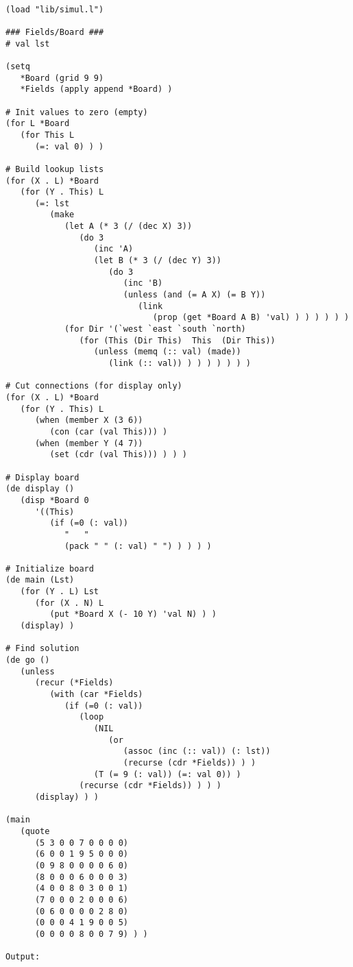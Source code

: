\begin{verbatim}

(load "lib/simul.l")

### Fields/Board ###
# val lst

(setq
   *Board (grid 9 9)
   *Fields (apply append *Board) )

# Init values to zero (empty)
(for L *Board
   (for This L
      (=: val 0) ) )

# Build lookup lists
(for (X . L) *Board
   (for (Y . This) L
      (=: lst
         (make
            (let A (* 3 (/ (dec X) 3))
               (do 3
                  (inc 'A)
                  (let B (* 3 (/ (dec Y) 3))
                     (do 3
                        (inc 'B)
                        (unless (and (= A X) (= B Y))
                           (link
                              (prop (get *Board A B) 'val) ) ) ) ) ) )
            (for Dir '(`west `east `south `north)
               (for (This (Dir This)  This  (Dir This))
                  (unless (memq (:: val) (made))
                     (link (:: val)) ) ) ) ) ) ) )

# Cut connections (for display only)
(for (X . L) *Board
   (for (Y . This) L
      (when (member X (3 6))
         (con (car (val This))) )
      (when (member Y (4 7))
         (set (cdr (val This))) ) ) )

# Display board
(de display ()
   (disp *Board 0
      '((This)
         (if (=0 (: val))
            "   "
            (pack " " (: val) " ") ) ) ) )

# Initialize board
(de main (Lst)
   (for (Y . L) Lst
      (for (X . N) L
         (put *Board X (- 10 Y) 'val N) ) )
   (display) )

# Find solution
(de go ()
   (unless
      (recur (*Fields)
         (with (car *Fields)
            (if (=0 (: val))
               (loop
                  (NIL
                     (or
                        (assoc (inc (:: val)) (: lst))
                        (recurse (cdr *Fields)) ) )
                  (T (= 9 (: val)) (=: val 0)) )
               (recurse (cdr *Fields)) ) ) )
      (display) ) )

(main
   (quote
      (5 3 0 0 7 0 0 0 0)
      (6 0 0 1 9 5 0 0 0)
      (0 9 8 0 0 0 0 6 0)
      (8 0 0 0 6 0 0 0 3)
      (4 0 0 8 0 3 0 0 1)
      (7 0 0 0 2 0 0 0 6)
      (0 6 0 0 0 0 2 8 0)
      (0 0 0 4 1 9 0 0 5)
      (0 0 0 0 8 0 0 7 9) ) )

Output:


\end{verbatim}
